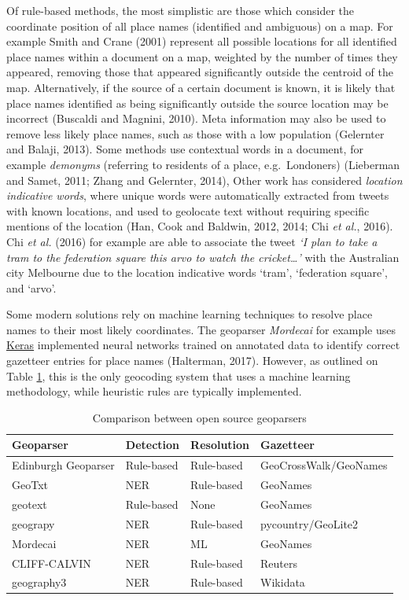 \documentclass[
  letterpaper,
  11pt,
  english,
  onehalfspacing,
  headsepline]{MastersDoctoralThesis}
\begin{document}
Of rule-based methods, the most simplistic are those which consider the
coordinate position of all place names (identified and ambiguous) on a
map. For example Smith and Crane (2001) represent all possible locations
for all identified place names within a document on a map, weighted by
the number of times they appeared, removing those that appeared
significantly outside the centroid of the map. Alternatively, if the
source of a certain document is known, it is likely that place names
identified as being significantly outside the source location may be
incorrect (Buscaldi and Magnini, 2010). Meta information may also be
used to remove less likely place names, such as those with a low
population (Gelernter and Balaji, 2013). Some methods use contextual
words in a document, for example \emph{demonyms} (referring to residents
of a place, e.g.~Londoners) (Lieberman and Samet, 2011; Zhang and
Gelernter, 2014), Other work has considered \emph{location indicative
words}, where unique words were automatically extracted from tweets with
known locations, and used to geolocate text without requiring specific
mentions of the location (Han, Cook and Baldwin, 2012, 2014; Chi
\emph{et al.}, 2016). Chi \emph{et al.} (2016) for example are able to
associate the tweet \emph{`I plan to take a tram to the federation
square this arvo to watch the cricket\ldots{}'} with the Australian city
Melbourne due to the location indicative words `tram', `federation
square', and `arvo'.

Some modern solutions rely on machine learning techniques to resolve
place names to their most likely coordinates. The geoparser
\emph{Mordecai} for example uses \href{https://keras.io}{Keras}
implemented neural networks trained on annotated data to identify
correct gazetteer entries for place names (Halterman, 2017). However, as
outlined on Table \ref{tbl-geoparsers}, this is the only geocoding
system that uses a machine learning methodology, while heuristic rules
are typically implemented.

\begin{table}
    \caption{\label{tbl-geoparsers} Comparison between open source geoparsers}
    \centering
    \fontsize{9}{11}\selectfont
    \begin{tabular}[h]{llll}
    \toprule
        \textbf{Geoparser} & \textbf{Detection} & \textbf{Resolution} & \textbf{Gazetteer} \\
    \midrule
        Edinburgh Geoparser & Rule-based & Rule-based & GeoCrossWalk/GeoNames \\
        GeoTxt & NER & Rule-based & GeoNames \\
        geotext & Rule-based & None & GeoNames \\
        geograpy & NER & Rule-based & pycountry/GeoLite2 \\
        Mordecai & NER & ML & GeoNames \\
        CLIFF-CALVIN & NER & Rule-based & Reuters \\
        geography3 & NER & Rule-based & Wikidata \\
    \bottomrule
    \end{tabular}
\end{table}
\end{document}
